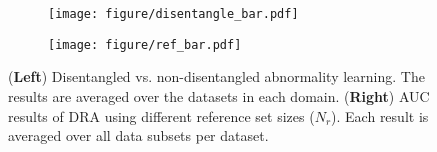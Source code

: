 \documentclass[10pt,twocolumn,letterpaper]{article}
\begin{document}
\begin{figure}[t] 
    \centering
    \begin{subfigure}[b]{0.47\linewidth}
         \centering    
            \texttt{[image: figure/disentangle\_bar.pdf]}
            \label{fig:ref_sen}
    \end{subfigure}
        \begin{subfigure}[b]{0.47\linewidth}
         \centering     \texttt{[image: figure/ref\_bar.pdf]}
         \label{fig:disentangle}
    \end{subfigure}
    \vspace{-0.55cm}
    \caption{(\textbf{Left}) Disentangled vs. non-disentangled abnormality learning. The results are averaged over the datasets in each domain. (\textbf{Right}) AUC results of DRA using different reference set sizes ($\mathit{N}_{r}$). Each result is averaged over all data subsets per dataset.}
    \label{fig:combined}
    \vspace{-0.5cm}
\end{figure}
\end{document}
